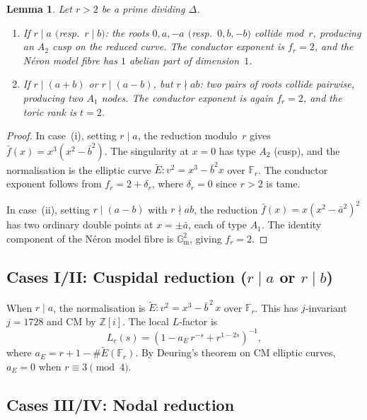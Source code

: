 \documentclass[11pt,a4paper]{article}
\newcommand{\Gm}{\mathbb{G}_{\mathrm{m}}}
\newtheorem{lemma}[theorem]{Lemma}
\theoremstyle{definition}
\theoremstyle{remark}
\begin{document}
\begin{lemma}\label{lem:redtype}
  Let $r > 2$ be a prime dividing $\Delta$.
  \begin{enumerate}[label=$(\roman*)$]
    \item If $r \mid a$ $($resp.\ $r \mid b)$: the roots
      $0, a, -a$ $($resp.\ $0, b, -b)$ collide mod~$r$,
      producing an $A_2$ cusp on the reduced curve.
      The conductor exponent is $f_r = 2$, and the N\'eron model
      fibre has $1$ abelian part of dimension~$1$.
    \item If $r \mid (a+b)$ or $r \mid (a-b)$, but $r \nmid ab$:
      two pairs of roots collide pairwise, producing two $A_1$
      nodes. The conductor exponent is again $f_r = 2$, and the
      toric rank is $t = 2$.
  \end{enumerate}
\end{lemma}

\begin{proof}
  In case~(i), setting $r \mid a$, the reduction modulo~$r$ gives
  $\bar{f}(x) = x^3(x^2 - \bar{b}^2)$.
  The singularity at $x = 0$ has type $A_2$ (cusp), and the
  normalisation is the elliptic curve
  $\tilde{E}\colon v^2 = x^3 - \bar{b}^2 x$ over $\mathbb{F}_r$.
  The conductor exponent follows from
  $f_r = 2 + \delta_r$, where $\delta_r = 0$ since $r > 2$
  is tame.

  In case~(ii), setting $r \mid (a-b)$ with $r \nmid ab$,
  the reduction $\bar{f}(x) = x(x^2 - \bar{a}^2)^2$ has
  two ordinary double points at $x = \pm\bar{a}$, each of type $A_1$.
  The identity component of the N\'eron model fibre is
  $\Gm^2$, giving $f_r = 2$.
\end{proof}

\subsection{Cases I/II: Cuspidal reduction ($r \mid a$ or $r \mid b$)}

When $r \mid a$, the normalisation is
$\tilde{E}\colon v^2 = x^3 - \bar{b}^{\,2}\, x$ over $\mathbb{F}_r$.
This has $j$-invariant $j = 1728$ and CM by $\mathbb{Z}[i]$.
The local $L$-factor is
\begin{equation}\label{eq:Lcusp}
  L_r(s) = (1 - a_E\, r^{-s} + r^{1-2s})^{-1},
\end{equation}
where $a_E = r + 1 - \#\tilde{E}(\mathbb{F}_r)$.
By Deuring's theorem on CM elliptic curves,
$a_E = 0$ when $r \equiv 3 \pmod{4}$.

\subsection{Cases III/IV: Nodal reduction}
\end{document}
